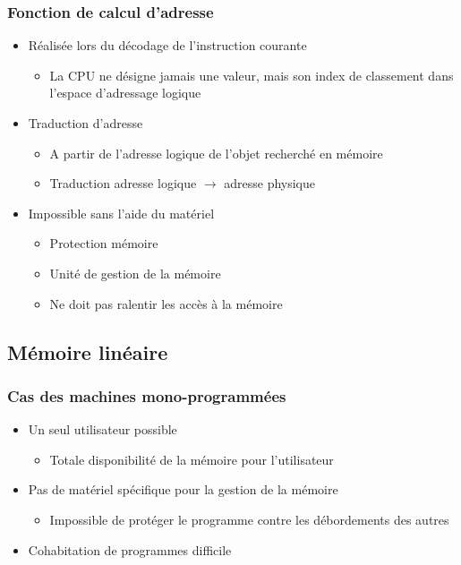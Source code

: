 \begin{frame}
\frametitle{Fonction de calcul d’adresse}
\begin{itemize}
\item <1>Réalisée lors du décodage de l’instruction courante
\begin{itemize}
  \item La CPU ne désigne jamais une valeur, mais son index de classement dans l’espace d’adressage logique
\end{itemize}
\item <2>Traduction d'adresse
\begin{itemize}
\item A partir de l’adresse logique de l’objet recherché en mémoire
\item Traduction adresse logique $\rightarrow$ adresse physique
\end{itemize}
\item <3>Impossible sans l'aide du matériel
\begin{itemize}
\item Protection mémoire
\item Unité de gestion de la mémoire
\item Ne doit pas ralentir les accès à la mémoire
\end{itemize}
\end{itemize}
\end{frame}



\subsection{Mémoire linéaire}


\begin{frame}
\frametitle{Cas des machines mono-programmées}
\begin{itemize}
\item Un seul utilisateur possible
\begin{itemize}
\item Totale disponibilité de la mémoire pour l'utilisateur
\end{itemize}
\item Pas de matériel spécifique pour la gestion de la mémoire
\begin{itemize}
\item Impossible de protéger le programme contre les débordements des autres
\end{itemize}
\item Cohabitation de programmes difficile
\end{itemize}
\end{frame}


